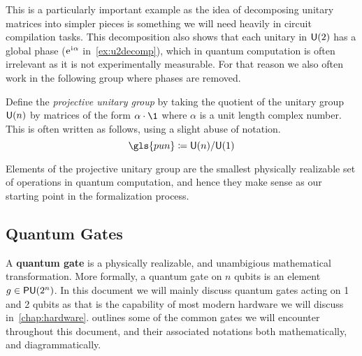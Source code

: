 This is a particularly important example as the idea of decomposing unitary matrices into simpler pieces is something we will need heavily in circuit compilation tasks.
This decomposition also shows that each unitary in $\mathsf{U} (2)$ has a global phase ($\mathrm{e}^{\mkern1mu\mathrm{i}\mkern1mu\alpha}$ in~\cref{ex:u2decomp}), which in quantum computation is often irrelevant as it is not experimentally measurable.
For that reason we also often work in the following group where phases are removed.
\begin{definition}
    Define the \emph{projective unitary group} by taking the quotient of the unitary group $\mathsf{U} (n)$ by matrices of the form $\alpha \cdot \1$ where $\alpha$ is a unit length complex number.
    This is often written as follows, using a slight abuse of notation.
    \begin{equation}
        \gls{pun} \defeq \U{n} / \U{1}
    \end{equation}
\end{definition}
Elements of the projective unitary group are the smallest physically realizable set of operations in quantum computation, and hence they make sense as our starting point in the formalization process.

\subsection{Quantum Gates}

A \textbf{quantum gate} is a physically realizable, and unambigious mathematical transformation.
More formally, a quantum gate on $n$ qubits is an element $g \in \mathsf{PU} (2^n)$.
In this document we will mainly discuss quantum gates acting on 1 and 2 qubits as that is the capability of most modern hardware we will discuss in~\cref{chap:hardware}.
 outlines some of the common gates we will encounter throughout this document, and their associated notations both mathematically, and diagrammatically.

